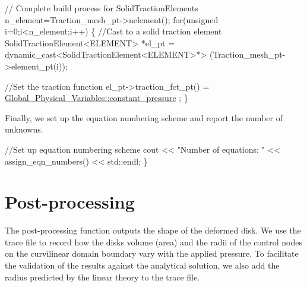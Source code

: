\begin{DoxyCodeInclude}

 \textcolor{comment}{// Complete build process for SolidTractionElements}
 n\_element=Traction\_mesh\_pt->nelement();
 \textcolor{keywordflow}{for}(\textcolor{keywordtype}{unsigned} i=0;i<n\_element;i++)
  \{
   \textcolor{comment}{//Cast to a solid traction element}
   SolidTractionElement<ELEMENT> *el\_pt = 
    \textcolor{keyword}{dynamic\_cast<}SolidTractionElement<ELEMENT>*\textcolor{keyword}{>}
    (Traction\_mesh\_pt->element\_pt(i));

   \textcolor{comment}{//Set the traction function}
   el\_pt->traction\_fct\_pt() = \hyperlink{namespaceGlobal__Physical__Variables_a19f4e20a92e7d216b4d2b00308f96917}{Global\_Physical\_Variables::constant\_pressure}
      ;
  \}

\end{DoxyCodeInclude}


Finally, we set up the equation numbering scheme and report the number of unknowns.


\begin{DoxyCodeInclude}

 \textcolor{comment}{//Set up equation numbering scheme}
 cout << \textcolor{stringliteral}{"Number of equations: "} <<  assign\_eqn\_numbers() << std::endl; 
\}

\end{DoxyCodeInclude}




 

\hypertarget{index_doc_solution}{}\section{Post-\/processing}\label{index_doc_solution}
The post-\/processing function outputs the shape of the deformed disk. We use the trace file to record how the disk\textquotesingle{}s volume (area) and the radii of the control nodes on the curvilinear domain boundary vary with the applied pressure. To facilitate the validation of the results against the analytical solution, we also add the radius predicted by the linear theory to the trace file.


